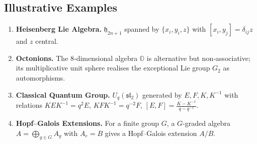 \subsection{Illustrative Examples}

\begin{enumerate}
    \item \textbf{Heisenberg Lie Algebra.}  
          \(\mathfrak{h}_{2n+1}\) spanned by \(\{x_i,y_i,z\}\) with \([x_i,y_j]=\delta_{ij}z\) and \(z\) central.
    \item \textbf{Octonions.}  
          The 8‑dimensional algebra \(\mathbb{O}\) is alternative but non‑associative; its multiplicative unit sphere realises the exceptional Lie group \(G_2\) as automorphisms.
    \item \textbf{Classical Quantum Group.}  
          \(U_q(\mathfrak{sl}_2)\) generated by \(E,F,K,K^{-1}\) with relations  
          \(KEK^{-1}=q^{2}E\), \(KFK^{-1}=q^{-2}F\), \([E,F]=\tfrac{K-K^{-1}}{q-q^{-1}}\).
    \item \textbf{Hopf–Galois Extensions.}  
          For a finite group \(G\), a \(G\)-graded algebra \(A=\bigoplus_{g\in G}A_g\) with \(A_e = B\) gives a Hopf–Galois extension \(A/B\).
\end{enumerate}
